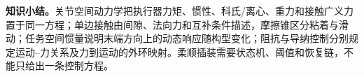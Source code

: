 \textbf{知识小结。}关节空间动力学把执行器力矩、惯性、科氏/离心、重力和接触广义力置于同一方程；单边接触由间隙、法向力和互补条件描述，摩擦锥区分粘着与滑动；任务空间惯量说明末端方向上的动态响应随构型变化；阻抗与导纳控制分别规定运动--力关系及力到运动的外环映射。柔顺插装需要状态机、阈值和恢复链，不能只给出一条控制方程。

